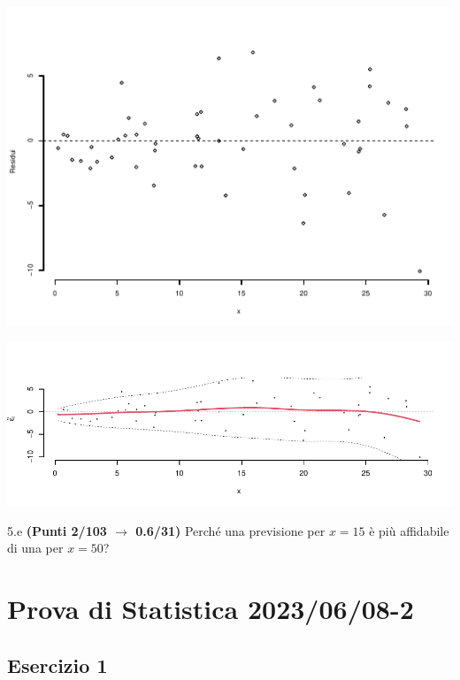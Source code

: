 \documentclass[
  11pt,
]{book}
\theoremstyle{mytheoremstyle}
\theoremstyle{mydefstyle}
\newenvironment{sol}
  {
  \begin{tcolorbox}[enhanced,breakable,arc=0.1mm,boxrule=1pt,colback=white,colframe=iblue,
  title=\bf \fontfamily{lmss}\selectfont \hspace{.5 cm} Soluzione,drop fuzzy shadow]

}{
\end{tcolorbox}
  }
\begin{document}
\begin{center}\includegraphics{Esami_passati_con_soluzioni_files/figure-latex/2023-39,-1} \end{center}

\begin{sol}

\begin{center}\includegraphics{Esami_passati_con_soluzioni_files/figure-latex/2023-40,-1} \end{center}

\end{sol}

5.e \textbf{(Punti 2/103 \(\rightarrow\) 0.6/31)} Perché una previsione per \(x=15\) è più affidabile di una per \(x=50\)?

\section{Prova di Statistica 2023/06/08-2}\label{prova-di-statistica-20230608-2}

\subsection{Esercizio 1}\label{esercizio-1-26}
\end{document}
